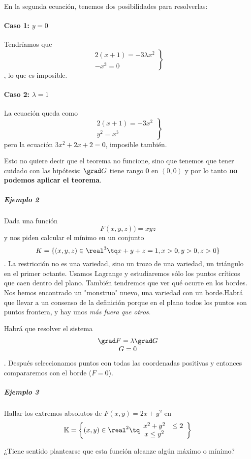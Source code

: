 En la segunda ecuación, tenemos dos posibilidades para resolverlas:

\paragraph{Caso 1: $y=0$}

Tendríamos que \[\left.\begin{matrix}2(x+1)=-3\lambda x^2 \\ -x^3 = 0\end{matrix}\right\rbrace \], lo que es imposible.

\paragraph{Caso 2: $\lambda = 1$}

La ecuación queda como \[\left.\begin{matrix}2(x+1)=-3x^2 \\ y^2=x^3 \end{matrix}\right\rbrace \] pero  la ecuación $3x^2+2x+2=0$, imposible también.

Esto no quiere decir que el teorema no funcione, sino que tenemos que tener cuidado con las hipótesis: $\grad G$ tiene rango 0 en $(0,0)$  y por lo tanto \textbf{no podemos aplicar el teorema}.
\subparagraph{Ejemplo 2}
Dada una función \[ F(x,y,z))=xyz \] y nos piden calcular el mínimo en un conjunto \[ K=\{(x,y,z)\in\real^3\tq x+y+z=1,x>0,y>0,z>0\} \]. La restricción no es una variedad, sino un trozo de una variedad, un triángulo en el primer octante. Usamos Lagrange y estudiaremos sólo los puntos críticos que caen dentro del plano. También tendremos que ver qué ocurre en los bordes. Nos hemos encontrado un "monstruo" nuevo, una variedad con un borde.Habrá que llevar a un consenso de la definición porque en el plano todos los puntos son puntos frontera, y hay unos \textit{más fuera que otros.} 

Habrá que resolver el sistema \[ \begin{matrix}\grad F=\lambda\grad G \\G=0\end{matrix} \]. Después seleccionamos puntos con todas las coordenadas positivas y entonces compararemos con el borde ($F=0$).

 
 \subparagraph{Ejemplo 3}
 Hallar los extremos absolutos de $F(x,y) = 2x+y^2$ en 
 \[\mathbb{K} = \left\{(x,y)\in\real^2 \tq \begin{array}{cc} x^2+y^2 &\leq 2\\ x\leq y^2\end{array}\right\}\]
 
 ¿Tiene sentido plantearse que esta función alcanze algún máximo o mínimo? 

